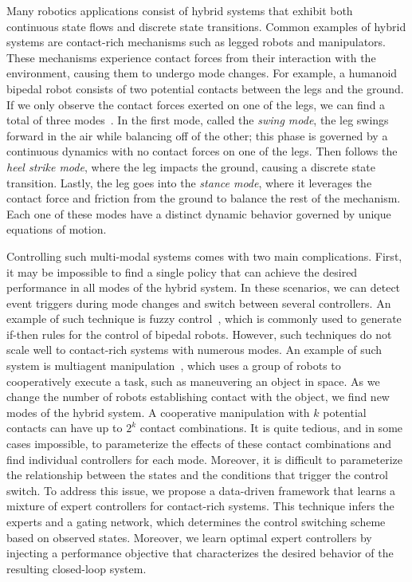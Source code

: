 

Many robotics applications consist of hybrid systems that exhibit both
continuous state flows and discrete state transitions. Common examples of hybrid
systems are contact-rich mechanisms such as legged robots and manipulators.
These mechanisms experience contact forces from their interaction with the
environment, causing them to undergo mode changes. 
%
For example, a humanoid bipedal robot consists of two potential contacts between
the legs and the ground.
%
If we only observe the contact forces exerted on one of the legs, we can find a
total of three modes~\cite{underactuated}.
%
In the first mode, called the \textit{swing mode}, the leg swings forward in the
air while balancing off of the other; this phase is governed by a continuous
dynamics with no contact forces on one of the legs. 
%
Then follows the \textit{heel strike mode}, where the leg impacts the ground,
causing a discrete state transition.
%
Lastly, the leg goes into the \textit{stance mode}, where it leverages the
contact force and friction from the ground to balance the rest of the mechanism.
%
Each one of these modes have a distinct dynamic behavior governed by unique
equations of motion.
%

Controlling such multi-modal systems comes with two main complications. First,
it may be impossible to find a single policy that can achieve the desired
performance in all modes of the hybrid system.
%
In these scenarios, we can detect event triggers during mode changes
and switch between several controllers.
%
An example of such technique is fuzzy control~\cite{kahraman2020fuzzy,
katic2003survey}, which is commonly used to generate if-then rules for the
control of bipedal robots. 
%
However, such techniques do not scale well to
contact-rich systems with numerous modes. 
%
An example of such system is multiagent
manipulation~\cite{ashenafi2021nonholonomic}, which uses a group of robots to
cooperatively execute a task, such as maneuvering an object in space. 
%
As we change the number of robots establishing contact with the object, we find
new modes of the hybrid system.
%
A cooperative manipulation with $k$ potential contacts can have up to $2^k$
contact combinations. 
%
It is quite tedious, and in some cases impossible, to parameterize
the effects of these contact combinations and find individual controllers for
each mode. Moreover, it is difficult to parameterize the relationship between
the states and the conditions that trigger the control switch.
%
To address this issue, we propose a data-driven framework that
learns a mixture of expert controllers for contact-rich systems.
%
This technique infers the experts and a gating network, which determines the
control switching scheme based on observed states.
%
Moreover, we learn optimal expert controllers by injecting a performance
objective that characterizes the desired behavior of the resulting closed-loop
system.



